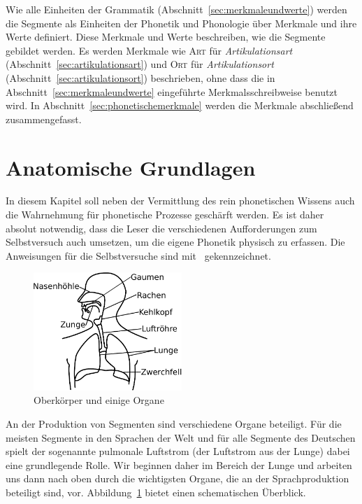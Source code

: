 
Wie alle Einheiten der Grammatik (Abschnitt~\ref{sec:merkmaleundwerte}) werden die Segmente als Einheiten der Phonetik und Phonologie über Merkmale und ihre Werte definiert.
Diese Merkmale und Werte beschreiben, wie die Segmente gebildet werden.
Es werden Merkmale wie \textsc{Art} für \textit{Artikulationsart} (Abschnitt~\ref{sec:artikulationsart}) und \textsc{Ort} für \textit{Artikulationsort} (Abschnitt~\ref{sec:artikulationsort}) beschrieben, ohne dass die in Abschnitt~\ref{sec:merkmaleundwerte} eingeführte Merkmalsschreibweise benutzt wird.
In Abschnitt~\ref{sec:phonetischemerkmale} werden die Merkmale abschließend zusammengefasst.

\section{Anatomische Grundlagen}

\label{sec:anatomischegrundlagen}

In diesem Kapitel soll neben der Vermittlung des rein phonetischen Wissens auch die Wahrnehmung für phonetische Prozesse geschärft werden.
Es ist daher absolut notwendig, dass die Leser die verschiedenen Aufforderungen zum Selbstversuch auch umsetzen, um die eigene Phonetik physisch zu erfassen.
Die Anweisungen für die Selbstversuche sind mit \TuBegin\ gekennzeichnet.

\begin{figure}
  \centering
  \includegraphics[width=0.5\textwidth]{figures/ueberblick}
  \caption{Oberkörper und einige Organe}
  \label{fig:lunge}
\end{figure}

An der Produktion von Segmenten sind verschiedene Organe beteiligt.
Für die meisten Segmente in den Sprachen der Welt und für alle Segmente des Deutschen spielt der sogenannte pulmonale Luftstrom (der Luftstrom aus der Lunge) dabei eine grundlegende Rolle.
Wir beginnen daher im Bereich der Lunge und arbeiten uns dann nach oben durch die wichtigsten Organe, die an der Sprachproduktion beteiligt sind, vor.
Abbildung~\ref{fig:lunge} bietet einen schematischen Überblick.

